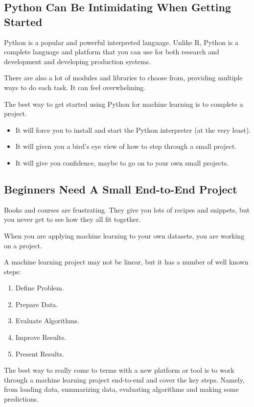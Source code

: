     
\subsection{Python Can Be Intimidating When Getting Started}

Python is a popular and powerful interpreted language. Unlike R, Python is a complete language and platform that you can use for both research and development and developing production systems.
    
There are also a lot of modules and libraries to choose from, providing multiple ways to do each task. It can feel overwhelming.
    
The best way to get started using Python for machine learning is to complete a project.
    
\begin{itemize}
  \item It will force you to install and start the Python interpreter (at the very least).
  \item It will given you a bird’s eye view of how to step through a small project.
  \item It will give you confidence, maybe to go on to your own small projects.
\end{itemize}    

\subsection{Beginners Need A Small End-to-End Project}

Books and courses are frustrating. They give you lots of recipes and snippets, but you never get to see how they all fit together.
    
When you are applying machine learning to your own datasets, you are working on a project.
    
A machine learning project may not be linear, but it has a number of well known steps:
    

\begin{enumerate}
  \item Define Problem.
  \item Prepare Data.
  \item Evaluate Algorithms.
  \item Improve Results.
  \item Present Results.
\end{enumerate}

The best way to really come to terms with a new platform or tool is to work through a machine learning project end-to-end and cover the key steps. Namely, from loading data, summarizing data, evaluating algorithms and making some predictions.
    
